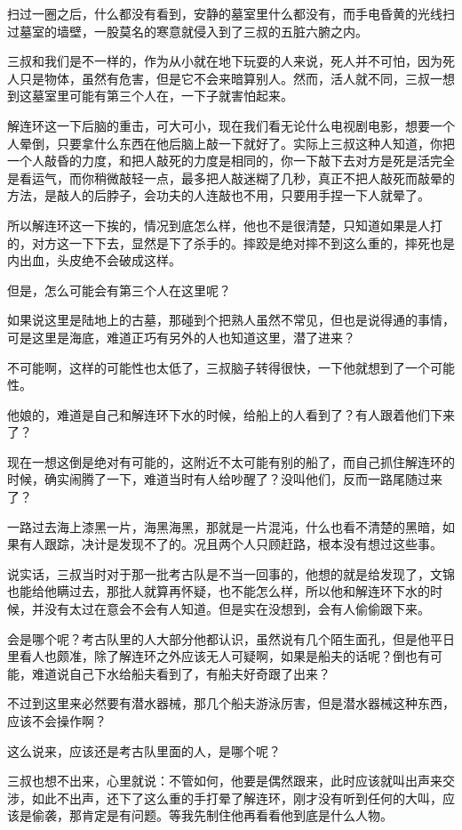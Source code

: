 扫过一圈之后，什么都没有看到，安静的墓室里什么都没有，而手电昏黄的光线扫过墓室的墙壁，一股莫名的寒意就侵入到了三叔的五脏六腑之内。

三叔和我们是不一样的，作为从小就在地下玩耍的人来说，死人并不可怕，因为死人只是物体，虽然有危害，但是它不会来暗算别人。然而，活人就不同，三叔一想到这墓室里可能有第三个人在，一下子就害怕起来。

解连环这一下后脑的重击，可大可小，现在我们看无论什么电视剧电影，想要一个人晕倒，只要拿什么东西在他后脑上敲一下就好了。实际上三叔这种人知道，你把一个人敲昏的力度，和把人敲死的力度是相同的，你一下敲下去对方是死是活完全是看运气，而你稍微敲轻一点，最多把人敲迷糊了几秒，真正不把人敲死而敲晕的方法，是敲人的后脖子，会功夫的人连敲也不用，只要用手捏一下人就晕了。

所以解连环这一下挨的，情况到底怎么样，他也不是很清楚，只知道如果是人打的，对方这一下下去，显然是下了杀手的。摔跤是绝对摔不到这么重的，摔死也是内出血，头皮绝不会破成这样。

但是，怎么可能会有第三个人在这里呢？

如果说这里是陆地上的古墓，那碰到个把熟人虽然不常见，但也是说得通的事情，可是这里是海底，难道正巧有另外的人也知道这里，潜了进来？

不可能啊，这样的可能性也太低了，三叔脑子转得很快，一下他就想到了一个可能性。

他娘的，难道是自己和解连环下水的时候，给船上的人看到了？有人跟着他们下来了？

现在一想这倒是绝对有可能的，这附近不太可能有别的船了，而自己抓住解连环的时候，确实闹腾了一下，难道当时有人给吵醒了？没叫他们，反而一路尾随过来了？

一路过去海上漆黑一片，海黑海黑，那就是一片混沌，什么也看不清楚的黑暗，如果有人跟踪，决计是发现不了的。况且两个人只顾赶路，根本没有想过这些事。

说实话，三叔当时对于那一批考古队是不当一回事的，他想的就是给发现了，文锦也能给他瞒过去，那批人就算再怀疑，也不能怎么样，所以他和解连环下水的时候，并没有太过在意会不会有人知道。但是实在没想到，会有人偷偷跟下来。

会是哪个呢？考古队里的人大部分他都认识，虽然说有几个陌生面孔，但是他平日里看人也颇准，除了解连环之外应该无人可疑啊，如果是船夫的话呢？倒也有可能，难道说自己下水给船夫看到了，有船夫好奇跟了出来？

不过到这里来必然要有潜水器械，那几个船夫游泳厉害，但是潜水器械这种东西，应该不会操作啊？

这么说来，应该还是考古队里面的人，是哪个呢？

三叔也想不出来，心里就说：不管如何，他要是偶然跟来，此时应该就叫出声来交涉，如此不出声，还下了这么重的手打晕了解连环，刚才没有听到任何的大叫，应该是偷袭，那肯定是有问题。等我先制住他再看看他到底是什么人物。

